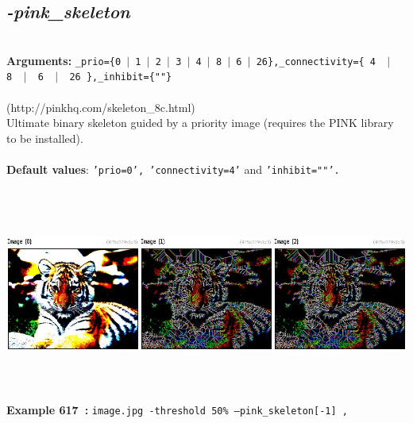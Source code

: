 \documentclass[a4paper,11pt,twoside]{book}
\begin{document}
\subsection{\emph{-pink\_skeleton} }\vspace*{-0.5em}
~\\\textbf{Arguments: } 
{\small \texttt{\_prio=\{0~$|$~1~$|$~2~$|$~3~$|$~4~$|$~8~$|$~6~$|$~26\},\_connectivity=\{ 4 ~$|$~ 8 ~$|$~ 6 ~$|$~ 26 \},\_inhibit=\{""\}}}\\~\\
(http://pinkhq.com/skeleton\_8c.html)
~\\Ultimate binary skeleton guided by a priority image (requires the PINK library to be installed).
~\\~\\\textbf{Default values}: {\small \texttt{'prio=0', 'connectivity=4'} and \texttt{'inhibit=""'.}}
\begin{center}\includegraphics[keepaspectratio=true,height=7cm,width=\textwidth]{img/gmic_def617.jpg}\\
{\footnotesize \textbf{Example 617~:} \texttt{image.jpg -threshold 50\% --pink\_skeleton[-1] ,}}
\end{center}
\end{document}
